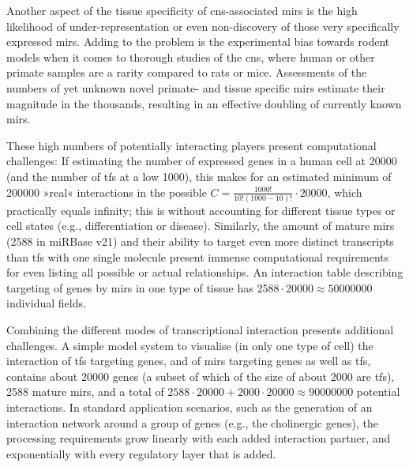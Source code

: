 Another aspect of the tissue specificity of \ac{cns}-associated \acp{mir} is the high likelihood of under-representation or even non-discovery of those very specifically expressed \acp{mir}. Adding to the problem is the experimental bias towards rodent models when it comes to thorough studies of the \ac{cns}, where human or other primate samples are a rarity compared to rats or mice. Assessments of the numbers of yet unknown novel primate- and tissue specific \acp{mir} estimate their magnitude in the thousands\cite{Londin2015}, resulting in an effective doubling of currently known \acp{mir}.

These high numbers of potentially interacting players present computational challenges: If estimating the number of expressed genes in a human cell at \num{20000} (and the number of \acp{tf} at a low 1000), this makes for an estimated minimum of \num{200000} »real« interactions in the possible $ C = \frac{1000!}{10!(1000-10)!} \cdot \num{20000} $, which practically equals infinity; this is without accounting for different tissue types or cell states (e.g., differentiation or disease). Similarly, the amount of mature \acp{mir} (2588 in miRBase v21) and their ability to target even more distinct transcripts than \acp{tf} with one single molecule present immense computational requirements for even listing all possible or actual relationships. An interaction table describing targeting of genes by \acp{mir} in one type of tissue has $ 2588 \cdot \num{20000} \approx \num{50000000} $ individual fields.

Combining the different modes of transcriptional interaction presents additional challenges. A simple model system to visualise (in only one type of cell) the interaction of \acp{tf} targeting genes, and of \acp{mir} targeting genes as well as \acp{tf}, contains about \num{20000} genes (a subset of which of the size of about 2000 are \acp{tf}), 2588 mature \acp{mir}, and a total of $ 2588 \cdot \num{20000} + 2000 \cdot \num{20000} \approx \num{90000000} $ potential interactions. In standard application scenarios, such as the generation of an interaction network around a group of genes (e.g., the cholinergic genes), the processing requirements grow linearly with each added interaction partner, and exponentially with every regulatory layer that is added. 

